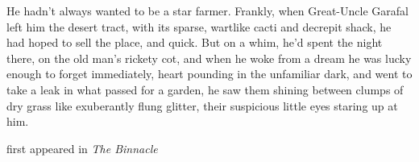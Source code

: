 He hadn't always wanted to be a star farmer. Frankly, when Great-Uncle
Garafal left him the desert tract, with its sparse, wartlike cacti and
decrepit shack, he had hoped to sell the place, and quick. But on a
whim, he'd spent the night there, on the old man's rickety cot, and when
he woke from a dream he was lucky enough to forget immediately, heart
pounding in the unfamiliar dark, and went to take a leak in what passed
for a garden, he saw them shining between clumps of dry grass like
exuberantly flung glitter, their suspicious little eyes staring up at
him.

first appeared in \emph{The Binnacle}
